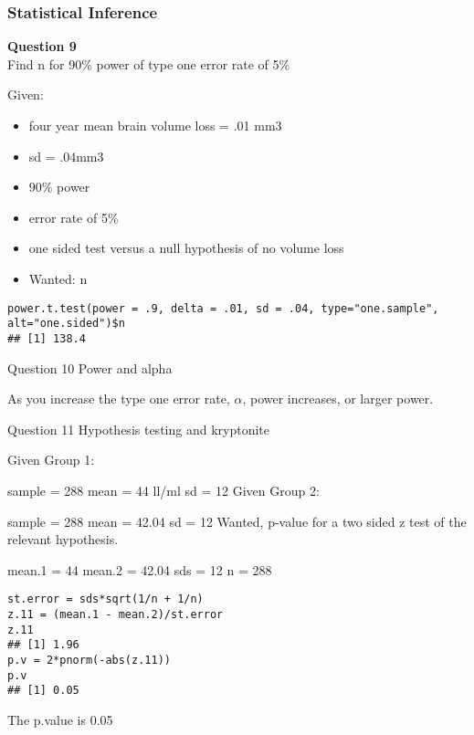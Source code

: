 \begin{frame}[fragile]
\frametitle{Statistical Inference}
\noindent\textbf{Question 9}\\
 Find n for 90\% power of type one error rate of 5\%

Given:

\begin{itemize}
\item four year mean brain volume loss = .01 mm3
\item sd = .04mm3
\item 90\% power
\item error rate of 5\%
\item one sided test versus a null hypothesis of no volume loss
\item Wanted: n
\end{itemize}

\begin{verbatim}
power.t.test(power = .9, delta = .01, sd = .04, type="one.sample", alt="one.sided")$n
## [1] 138.4
\end{verbatim}
\end{frame}
\begin{frame}[fragile]
Question 10 Power and alpha

As you increase the type one error rate, \( \alpha \), power increases, or larger power.

\end{frame}
\begin{frame}[fragile]
Question 11 Hypothesis testing and kryptonite

Given Group 1:

sample = 288
mean = 44 ll/ml
sd = 12
Given Group 2:

sample = 288
mean = 42.04
sd = 12
Wanted, p-value for a two sided z test of the relevant hypothesis.


\end{frame}
\begin{frame}[fragile]
mean.1 = 44
mean.2 = 42.04
sds = 12
n = 288


\end{frame}
\begin{frame}[fragile]
\begin{verbatim}
st.error = sds*sqrt(1/n + 1/n)
z.11 = (mean.1 - mean.2)/st.error
z.11
## [1] 1.96
p.v = 2*pnorm(-abs(z.11))
p.v
## [1] 0.05
\end{verbatim}
The p.value is 0.05

\end{frame}
